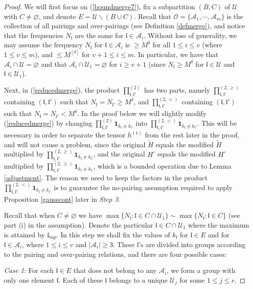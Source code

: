 \documentclass[11 pt,reqno]{amsart}
\theoremstyle{definition}
\theoremstyle{remark}
\numberwithin{equation}{section}
\newcommand{\Uc}{\mathcal{U}}
\newcommand{\Ac}{\mathcal{A}}
\newcommand{\lf}{\mathfrak{l}}
\newcommand{\Os}{\mathscr{O}}
\begin{document}
{\begin{proof}
We will first focus on (\ref{boundmerge7}), fix a subpartition $(B,C)$ of $\Uc$ with $C\neq\varnothing$, and denote $E=\Uc\backslash(B\cup C)$. Recall that $\Os=\{\Ac_1,\cdots,\Ac_m\}$ is the collection of all pairings and over-pairings (see Definition \ref{defmerge}), and notice that the frequencies $N_\lf$ are the same for $\lf\in\Ac_i$. Without loss of generality,  we may assume the frequency  $N_\lf$ for $\lf\in\Ac_i$ is $\geq M^\delta$ for all $1\leq i\leq v$ (where $1\leq v\leq m$), and $\leq M^{[\delta]}$ for $v+1\leq i\leq m$. In particular, we have that $\Ac_i\cap\Uc=\varnothing$ and that $\Ac_i\cap \Uc_1=\varnothing$ for $i\geq v+1$ (since $N_\lf\geq M^\delta$ for $\lf\in\Uc$ and $\lf\in\Uc_1$).

Next, in (\ref{reducedmerge}), the product $\prod_{\lf,\lf'}^{(2)}$ has two parts, namely $\prod_{\lf,\lf'}^{(2,\geq)}$ containing $(\lf,\lf')$ such that $N_\lf=N_{\lf'}\geq M^\delta$, and $\prod_{\lf,\lf'}^{(2,<)}$ containing $(\lf,\lf')$ such that $N_\lf=N_{\lf'}< M^\delta$. In the proof below we will slightly modify (\ref{reducedmerge}) by changing $\prod_{\lf,\lf'}^{(2)} \mathbf{1}_{k_\lf\neq k_{\lf'}}$ into $\prod_{\lf,\lf'}^{(2,<)} \mathbf{1}_{k_\lf\neq k_{\lf'}}$. This will be necessary in order to separate the tensor $h^{(1)}$ from the rest later in the proof, and will not cause a problem, since the original $\widetilde{H}$ equals the modified $\widetilde{H}$ multiplied by $\prod_{\lf,\lf'}^{(2,\geq)}\mathbf{1}_{k_\lf\neq k_{\lf'}}$, and the original $H^\circ$ equals the modified $H^\circ$ multiplied by $\prod_{\lf,\lf'}^{(2,\geq)}\mathbf{1}_{k_\lf\neq k_{\lf'}}$, which is a bounded operation due to Lemma \ref{adjustment}.
The reason we need to keep the factors in the product $\prod_{\lf,\lf'}^{(2,<)}\mathbf{1}_{k_\lf\neq k_{\lf'}}$ is to guarantee the no-pairing assumption required to apply Proposition \ref{gausscont} later in \emph{Step 3}.

Recall that when $C\neq\varnothing$ we have $\max\{N_\lf:\lf\in C\cap\Uc_1\}\sim\max\{N_\lf:\lf\in C\}$  (see part (i) in the assumption). Denote the particular $\lf\in C\cap\Uc_1$  where the maximum is attained by $\lf_{\mathrm{top}}$. In this step we shall fix the values of $k_\lf$ for $\lf\in E$ and for $\lf\in \Ac_i$,  where $1\leq i\leq v$ and $|\Ac_i|\geq 3$. These $\lf$'s are divided into groups according to the pairing and over-pairing relations, and there are four possible cases:

\emph{Case 1}: 
For each $\lf\in E$ that does not belong to any $\Ac_i$, we form a group with only one element $\lf$. Each of these $\lf$ belongs to a unique $\Uc_j$ for some $1\leq j\leq r$.


\end{proof}}
\end{document}
